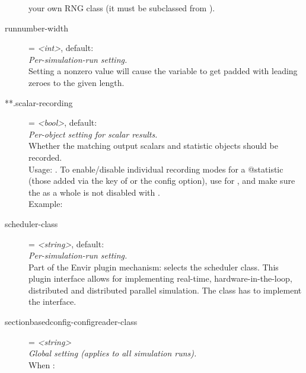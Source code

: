 \begin{description}
    your own RNG class (it must be subclassed from ).
\item[runnumber-width] = \textit{<int>}, default: \\
    \textit{Per-simulation-run setting.}\\
    Setting a nonzero value will cause the  variable to get
    padded with leading zeroes to the given length.
\item[**.scalar-recording] = \textit{<bool>}, default: \\
    \textit{Per-object setting for scalar results.}\\
    Whether the matching output scalars and statistic objects should be
    recorded.\\
    Usage:
    .
    To enable/disable individual recording modes for a @statistic (those added
    via the  key of
     or the
    config option), use 
    for , and make sure the
     as a whole is not disabled with
    .\\
    Example:
\item[scheduler-class] = \textit{<string>}, default: \\
    \textit{Per-simulation-run setting.}\\
    Part of the Envir plugin mechanism: selects the scheduler class. This
    plugin interface allows for implementing real-time, hardware-in-the-loop,
    distributed and distributed parallel simulation. The class has to implement
    the  interface.
\item[sectionbasedconfig-configreader-class] = \textit{<string>}\\
    \textit{Global setting (applies to all simulation runs).}\\
    When
    :

\end{description}
